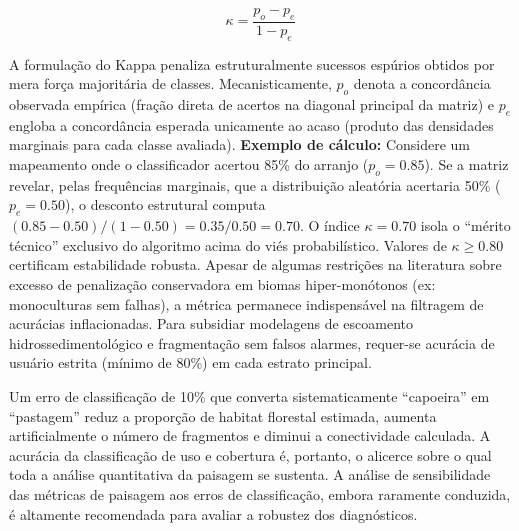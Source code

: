\documentclass[
  portuguese,
  11pt,
  a4paper,
  open=any]{scrbook}
\begin{document}
\[
\kappa = \frac{p_o - p_e}{1 - p_e}
\]

A formulação do Kappa penaliza estruturalmente sucessos espúrios obtidos
por mera força majoritária de classes. Mecanisticamente, \(p_o\) denota
a concordância observada empírica (fração direta de acertos na diagonal
principal da matriz) e \(p_e\) engloba a concordância esperada
unicamente ao acaso (produto das densidades marginais para cada classe
avaliada). \textbf{Exemplo de cálculo:} Considere um mapeamento onde o
classificador acertou 85\% do arranjo (\(p_o = 0.85\)). Se a matriz
revelar, pelas frequências marginais, que a distribuição aleatória
acertaria 50\% (\(p_e = 0.50\)), o desconto estrutural computa
\((0.85 - 0.50) / (1 - 0.50) = 0.35 / 0.50 = 0.70\). O índice
\(\kappa = 0.70\) isola o ``mérito técnico'' exclusivo do algoritmo
acima do viés probabilístico. Valores de \(\kappa \ge 0.80\) certificam
estabilidade robusta. Apesar de algumas restrições na literatura sobre
excesso de penalização conservadora em biomas hiper-monótonos (ex:
monoculturas sem falhas), a métrica permanece indispensável na filtragem
de acurácias inflacionadas. Para subsidiar modelagens de escoamento
hidrossedimentológico e fragmentação sem falsos alarmes, requer-se
acurácia de usuário estrita (mínimo de 80\%) em cada estrato principal.

\begin{tcolorbox}[enhanced jigsaw, colbacktitle=quarto-callout-important-color!10!white, coltitle=black, opacityback=0, breakable, left=2mm, colback=white, bottomtitle=1mm, toptitle=1mm, titlerule=0mm, arc=.35mm, opacitybacktitle=0.6, leftrule=.75mm, colframe=quarto-callout-important-color-frame, title=\textcolor{quarto-callout-important-color}{\faExclamation}\hspace{0.5em}{Propagação de erros para métricas de paisagem}, rightrule=.15mm, bottomrule=.15mm, toprule=.15mm]

Um erro de classificação de 10\% que converta sistematicamente
``capoeira'' em ``pastagem'' reduz a proporção de habitat florestal
estimada, aumenta artificialmente o número de fragmentos e diminui a
conectividade calculada. A acurácia da classificação de uso e cobertura
é, portanto, o alicerce sobre o qual toda a análise quantitativa da
paisagem se sustenta. A análise de sensibilidade das métricas de
paisagem aos erros de classificação, embora raramente conduzida, é
altamente recomendada para avaliar a robustez dos diagnósticos.

\end{tcolorbox}
\end{document}
